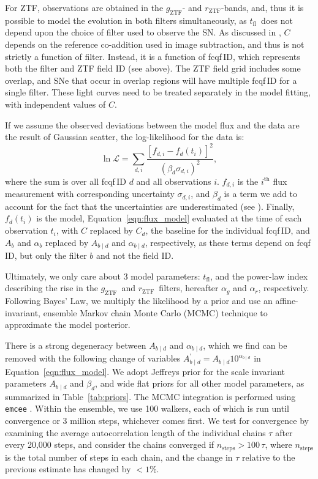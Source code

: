 \documentclass[twocolumn]{./aastex63}
\newcommand{\rztf}{$r_\mathrm{ZTF}$}
\newcommand{\gztf}{$g_\mathrm{ZTF}$}
\newcommand{\tfl}{$t_\mathrm{fl}$}
\begin{document}
For ZTF, observations are obtained in the \gztf- and \rztf-bands, and, thus
it is possible to model the evolution in both filters simultaneously, as
\tfl\ does not depend upon the choice of filter used to observe the SN. As
discussed in \citet{Yao19}, $C$ depends on the reference co-addition used in
image subtraction, and thus is not strictly a function of filter. Instead,
it is a function of fcqf\,ID, which represents both the filter and ZTF field
ID (see above). The ZTF field grid includes some overlap, and SNe that occur
in overlap regions will have multiple fcqf\,ID for a single filter. These
light curves need to be treated separately in the model fitting, with
independent values of $C$.

If we assume the observed deviations between the model flux and the data are the result of Gaussian scatter, the log-likelihood for the data is:
%
\begin{equation}
    \ln \mathscr{L} = \sum_{d,i} \frac{[f_{d,i} - f_d(t_i)]^2}{(\beta_d \sigma_{d,i})^2},
\end{equation}
%
where the sum is over all fcqf\,ID $d$ and all observations $i$. $f_{d,i}$
is the $i^\mathrm{th}$ flux measurement with corresponding uncertainty
$\sigma_{d,i}$, and $\beta_d$ is a term we add to account for the fact that
the uncertainties are underestimated (see \citealt{Yao19}). Finally,
$f_d(t_i)$ is the model, Equation~\ref{eqn:flux_model} evaluated at the time
of each observation $t_i$, with $C$ replaced by $C_d$, the baseline for the
individual fcqf\,ID, and $A_b$ and $\alpha_b$ replaced by $A_{b\mid d}$ and
$\alpha_{b\mid d}$, respectively, as these terms depend on fcqf\,ID, but
only the filter $b$ and not the field ID.

Ultimately, we only care about 3 model parameters: \tfl, and the power-law
index describing the rise in the \gztf\ and \rztf\ filters, hereafter
$\alpha_g$ and $\alpha_r$, respectively. Following Bayes' Law, we multiply
the likelihood by a prior and use an affine-invariant, ensemble Markov chain
Monte Carlo (MCMC) technique \citep{Goodman10} to approximate the model
posterior. 

There is a strong degeneracy between $A_{b\mid d}$ and $\alpha_{b\mid d}$,
which we find can be removed with the following change of variables
$A^\prime_{b\mid d} = A_{b\mid d} 10^{\alpha_{b\mid d}}$ in
Equation~\ref{eqn:flux_model}. We adopt Jeffreys prior \citep{Jeffreys46} for
the scale invariant parameters $A_{b\mid d}$ and $\beta_d$, and wide flat
priors for all other model parameters, as summarized in
Table~\ref{tab:priors}. The MCMC integration is performed using
\texttt{emcee} \citep{Foreman-Mackey13}. Within the ensemble, we use 100
walkers, each of which is run until convergence or 3 million steps, whichever
comes first. We test for convergence by examining the average autocorrelation
length of the individual chains $\tau$ after every 20,000 steps, and consider
the chains converged if $n_\mathrm{steps} > 100 \,\tau$, where
$n_\mathrm{steps}$ is the total number of steps in each chain, and the change
in $\tau$ relative to the previous estimate has changed by $<1\%$.
\end{document}
